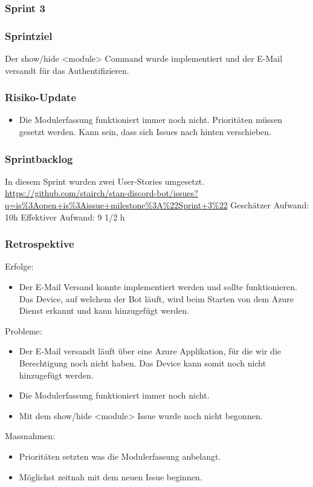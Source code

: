 \documentclass[a4paper, table]{article}
\begin{document}
\subsubsection{Sprint 3}
\subsubsection*{Sprintziel}
Der show/hide <module> Command wurde implementiert und der E-Mail versandt für das Authentifizieren.

\subsubsection*{Risiko-Update}
\begin{itemize}
    \item Die Modulerfassung funktioniert immer noch nicht.
    Prioritäten müssen gesetzt werden.
    Kann sein, dass sich Issues nach hinten verschieben.
\end{itemize}

\subsubsection*{Sprintbacklog}
In diesem Sprint wurden zwei User-Stories umgesetzt.\\
\url{https://github.com/stairch/stan-discord-bot/issues?q=is%3Aopen+is%3Aissue+milestone%3A%22Sprint+3%22}
\newline
Geschätzer Aufwand: 10h
\newline
Effektiver Aufwand: 9 1/2 h

\subsubsection*{Retrospektive}
Erfolge:
\begin{itemize}
    \item Der E-Mail Versand konnte implementiert werden und sollte funktionieren.
    Das Device, auf welchem der Bot läuft, wird beim Starten von dem Azure Dienst erkannt und kann hinzugefügt werden.
\end{itemize}
Probleme:
\begin{itemize}
    \item Der E-Mail versandt läuft über eine Azure Applikation, für die wir die Berechtigung noch nicht haben.
    Das Device kann somit noch nicht hinzugefügt werden.
    \item Die Modulerfassung funktioniert immer noch nicht.
    \item Mit dem show/hide <module> Issue wurde noch nicht begonnen.
\end{itemize}
Massnahmen:
\begin{itemize}
    \item Prioritäten setzten was die Modulerfassung anbelangt.
    \item Möglichst zeitnah mit dem neuen Issue beginnen.
\end{itemize}
\end{document}
